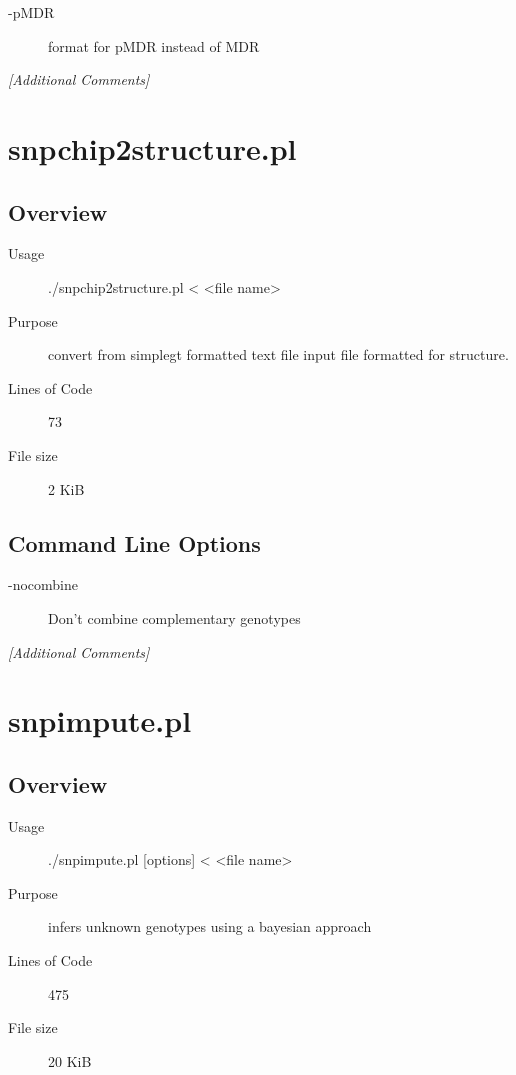 \begin{description}
\item[-pMDR] format for pMDR instead of MDR
\end{description}

\emph{[Additional Comments]}

\section{snpchip2structure.pl}
\label{sec:snpchip2structure.pl}

\subsection{Overview}
\label{sec:snpchip2structure.pl-overview}

\begin{description}
\item[Usage] ./snpchip2structure.pl < <file name>
\item[Purpose] convert from simplegt formatted text file input file formatted for structure.
\item[Lines of Code] 73
\item[File size] 2 KiB
\end{description}

\subsection{Command Line Options}
\label{sec:snpchip2structure.pl-command-line}

\begin{description}
\item[-nocombine] Don't combine complementary genotypes
\end{description}

\emph{[Additional Comments]}

\section{snpimpute.pl}
\label{sec:snpimpute.pl}

\subsection{Overview}
\label{sec:snpimpute.pl-overview}

\begin{description}
\item[Usage] ./snpimpute.pl [options] < <file name>
\item[Purpose] infers unknown genotypes using a bayesian approach
\item[Lines of Code] 475
\item[File size] 20 KiB
\end{description}

